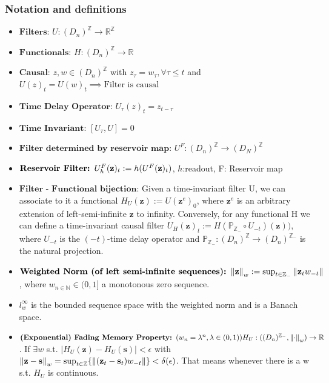 \documentclass{article}
\begin{document}
\subsubsection{Notation and definitions}
\begin{itemize}
    \item $\textbf{Filters: } U:(D_n)^\mathbb{Z} \rightarrow \mathbb{R}^\mathbb{Z}$
    \item $\textbf{Functionals: } H:(D_n)^\mathbb{Z} \rightarrow \mathbb{R}$
    \item $\textbf{Causal: } z,w \in  (D_n)^\mathbb{Z}$ with $z_\tau=w_\tau, \forall \tau \leq t$ and $U(z)_t = U(w)_t \implies \text{Filter is causal}$
    \item $\textbf{Time Delay Operator: } U_\tau(z)_t = z_{t-\tau}$
    \item $\textbf{Time Invariant: } [U_\tau,U]=0$
    \item $\textbf{Filter determined by reservoir map: } U^F: (D_n)^\mathbb{Z} \rightarrow (D_N)^\mathbb{Z}$
    \item $\textbf{Reservoir Filter: } U^F_h(\textbf z)_t := h(U^F(\textbf z)_t)$, $h$:readout, F: Reservoir map
    
    \item $\textbf{Filter - Functional bijection: }$Given a time-invariant filter U, we can associate to it a functional $H_U(\textbf{z}):= U(\textbf{z}^e)_0$, where $\textbf{z}^e$ is an arbitrary extension of left-semi-infinite $\textbf{z}$ to infinity.
    Conversely, for any functional H we can define a time-invariant causal filter $U_H(\textbf{z})_t := H(\mathbb{P}_{\mathbb{Z}_{-}} \circ U_{-t})(\textbf{z}))$, where $U_{-t}$ is the $(-t)$-time delay operator and $\mathbb{P}_{\mathbb{Z}_{-}} : (D_n)^\mathbb{Z} \rightarrow (D_n)^{\mathbb{Z}_-}$ is the natural projection.
    
    \item $\textbf{Weighted Norm (of left semi-infinite sequences): } \norm{\textbf{z}}_w := \sup_{t \in \mathbb{Z}_{-}} \norm{\textbf{z}_t w_{-t}}$ , where $w_{n \in \mathbb{N}} \in (0,1]$ a monotonous zero sequence.
    
    \item   $l^\infty_w$ is the bounded sequence space with the weighted norm and is a Banach space.
    
    \item $\textbf{(Exponential) Fading Memory Property: } (w_n = \lambda^n, \lambda \in (0,1) ) H_U:((D_n)^{\mathbb{Z}_-},\norm{\cdot}_w) \rightarrow \mathbb{R}$. If $\exists w$ s.t. $|H_U(\textbf{z})-H_U(\textbf{s})| < \epsilon$ with  $\norm{\textbf{z}-\textbf{s}}_w = \sup_{t \in \mathbb{Z}} \{ \norm{(\textbf{z}_t-\textbf{s}_t)w_{-t}} \} < \delta(\epsilon)$. That means whenever there is a w s.t. $H_U$ is continuous.
    
\end{itemize}
\end{document}
